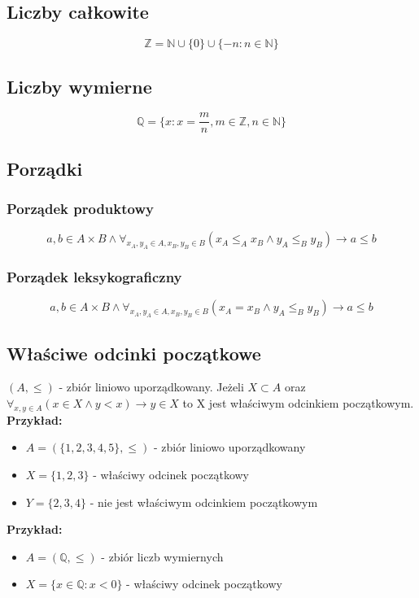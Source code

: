 \documentclass{../notatki}
\begin{document}
\subsection{Liczby całkowite}

$$
\mathbb{Z} = \mathbb{N} \cup \{0\} \cup \{-n: n \in \mathbb{N}\}
$$

\subsection{Liczby wymierne}

$$
\mathbb{Q} = \{x: x = \frac{m}{n}, m \in \mathbb{Z}, n \in \mathbb{N}\}
$$

\subsection{Porządki}

\subsubsection{Porządek produktowy}

$$
a, b \in A \times B \land \forall_{x_A, y_A \in A, x_B, y_B \in
B}(x_A \le_A x_B \land y_A \le_B y_B) \rightarrow a \le b
$$

\subsubsection{Porządek leksykograficzny}

$$
a, b \in A \times B \land \forall_{x_A, y_A \in A, x_B, y_B \in B}(x_A = x_B
\land y_A \le_B y_B) \rightarrow a \le b
$$

\subsection{Właściwe odcinki początkowe}

$(A, \le)$ - zbiór liniowo uporządkowany. Jeżeli $X \subset A$ oraz
$\forall_{x, y \in A}(x \in X \land y < x) \rightarrow y \in X$ to X jest
właściwym odcinkiem początkowym. \\
\textbf{Przykład:}
\begin{itemize}
  \item $A = (\{1, 2, 3, 4, 5\}, \le)$ - zbiór liniowo uporządkowany
  \item $X = \{1, 2, 3\}$ - właściwy odcinek początkowy
  \item $Y = \{2, 3, 4\}$ - nie jest właściwym odcinkiem początkowym
\end{itemize}
\textbf{Przykład:}
\begin{itemize}
  \item $A = (\mathbb{Q}, \le)$ - zbiór liczb wymiernych
  \item $X = \{x \in \mathbb{Q}: x < 0\}$ - właściwy odcinek początkowy
\end{itemize}
\end{document}
